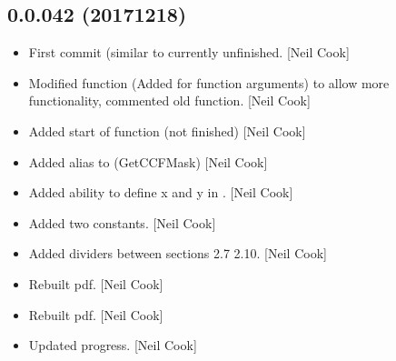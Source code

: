 \documentclass[a4paper,10pt,english]{report}
\begin{document}
\subsection{0.0.042 (2017\sphinxhyphen{}12\sphinxhyphen{}18)}
\label{\detokenize{misc/changelog:id528}}\begin{itemize}
\item {} 
First commit (similar to  \textendash{} currently unfinished.
{[}Neil Cook{]}

\item {} 
Modified  function (Added for function
arguments) to allow more functionality, commented old function. {[}Neil
Cook{]}

\item {} 
Added start of  function (not finished) {[}Neil Cook{]}

\item {} 
Added alias to  (GetCCFMask) {[}Neil Cook{]}

\item {} 
Added ability to define x and y in . {[}Neil
Cook{]}

\item {} 
Added two  constants. {[}Neil Cook{]}

\item {} 
Added dividers between sections 2.7 \sphinxhyphen{} 2.10. {[}Neil Cook{]}

\item {} 
Rebuilt pdf. {[}Neil Cook{]}

\item {} 
Rebuilt pdf. {[}Neil Cook{]}

\item {} 
Updated progress. {[}Neil Cook{]}

\end{itemize}
\end{document}
